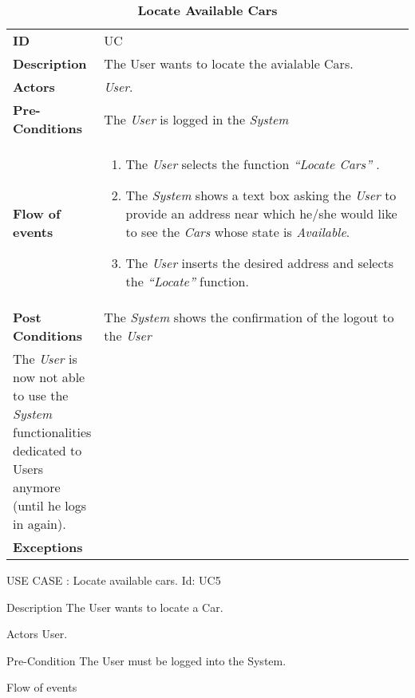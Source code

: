 \begin{longtable}{|p{0.2\linewidth} p{0.8\linewidth}|}
	\captionsetup{labelformat=empty} %
	\caption{\textbf{Locate Available Cars}} %
	\label{UC_LocateCars}%
	\\ \hline %
	
	\textbf{ID} & UC\theUseCaseIdCounter \\ \hline
	\textbf{Description} & The User wants to locate the avialable Cars. \\ \hline
	\textbf{Actors} & \emph{User}.\\ \hline
	\textbf{Pre-Conditions} & The \emph{User} is logged in the \emph{System} \\ \hline
	\textbf{Flow of events} & 
	\begin{enumerate}
		\item The \emph{User} selects the function \textit{\textquotedblleft{Locate Cars}\textquotedblright} .
		\item The \emph{System} shows a text box asking the \emph{User} to provide an address near which he/she would like to see the \emph{Cars} whose state is \textit{Available}.
		\item The \emph{User} inserts the desired address and selects the \textit{\textquotedblleft{Locate}\textquotedblright} function.
	\end{enumerate}	 \\ \hline
	\textbf{Post Conditions} & The \emph{System} shows the confirmation of the logout to the \emph{User}\\ \hline
	The \emph{User} is now not able to use the \emph{System} functionalities dedicated to Users anymore (until he logs in again). \\ \hline
	\textbf{Exceptions} & 
	\begin{itemize}
	\end{itemize} \\ \hline
\end{longtable}
USE CASE : Locate available cars.
Id:  UC5

Description
The User wants to locate a Car.

Actors
User.

Pre-Condition
The User must be logged into the System.

Flow of events

